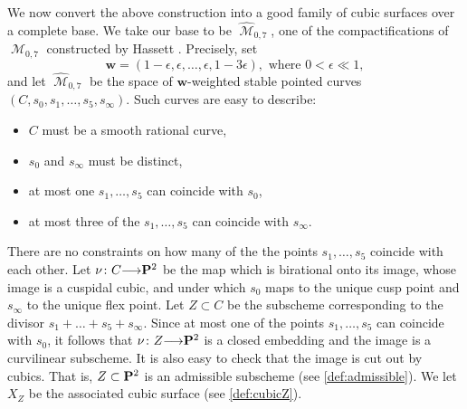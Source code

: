 \documentclass[reqno]{amsart}
\DeclareMathOperator{\M}{\mathcal{M}}
\renewcommand{\to}{{\longrightarrow}}
\renewcommand {\P}{{\bf P}}
\numberwithin{equation}{section}
\begin{document}
We now convert the above construction into a good family of cubic surfaces over a complete base.
We take our base to be $\widehat{\M}_{0,7}$, one of the compactifications of $\M_{0,7}$ constructed by Hassett \cite{has:03}.
Precisely, set
\[
  \mathbf{w} = \left(1-\epsilon, \epsilon, \dots, \epsilon, 1-3 \epsilon \right), \text{ where } 0 < \epsilon \ll 1,
\]
and let $\widehat{\M}_{0,7}$ be the space of $\mathbf{w}$-weighted stable pointed curves $(C, s_0, s_1, \dots, s_5, s_{\infty})$.
Such curves are easy to describe:
\begin{itemize}
\item $C$ must be a smooth rational curve,
\item $s_{0}$ and $s_{\infty}$ must be distinct,
\item at most one $s_1, \dots, s_5$ can coincide with $s_{0}$,
\item at most three of the $s_1, \dots, s_5$ can coincide with $s_{\infty}$.
\end{itemize}
There are no constraints on how many of the the points $s_1, \dots, s_5$ coincide with each other.
Let $\nu \colon C \to \P^2$ be the map which is birational onto its image, whose image is a cuspidal cubic, and under which $s_0$ maps to the unique cusp point and $s_{\infty}$ to the unique flex point.
Let $Z \subset C$ be the subscheme corresponding to the divisor $s_1 + \dots + s_5 + s_{\infty}$.
Since at most one of the points $s_1, \dots, s_5$ can coincide with $s_0$, it follows that $\nu \colon Z \to \P^2$ is a closed embedding and the image is a curvilinear subscheme.
It is also easy to check that the image is cut out by cubics.
That is, $Z \subset \P^2$ is an admissible subscheme (see \autoref{def:admissible}).
We let $X_Z$ be the associated cubic surface (see \autoref{def:cubicZ}).
\end{document}
